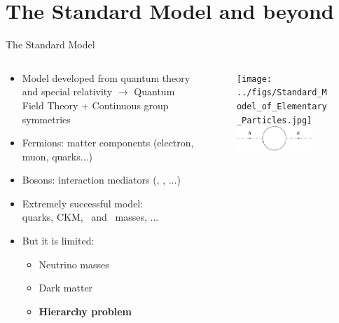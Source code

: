 \section[SM]{The Standard Model and beyond}
\setcounter{tocdepth}{2}

\begin{frame}{The Standard Model}
\vspace{-.2cm}
\begin{columns}

\begin{column}{.50\textwidth}
\begin{block}{}
\begin{itemize}\scriptsize
\item Model developed from quantum theory and special relativity $\to$ Quantum Field Theory + Continuous group symmetries
\item Fermions: matter components (electron, muon, quarks...)
\item Bosons: interaction mediators (\W, \Z, ...)
\item Extremely successful model: \\ quarks, CKM, \W~and \Z~masses, ...
\item But it is limited:
  \begin{itemize}\scriptsize
  \item Neutrino masses
  \item Dark matter
  \item \textbf{Hierarchy problem}
  \end{itemize}
\end{itemize}
\end{block}
\end{column}

\begin{column}{.50\textwidth}
\begin{figure}[!Hhtbp]
  \begin{center}
    \texttt{[image: ../figs/Standard\_Model\_of\_Elementary\_Particles.jpg]}\\
    \vspace{.6cm}
    \includegraphics[width=0.8\textwidth]{../figs/HierarchyLoop.png}
  \end{center}
\end{figure}
\end{column}
\end{columns}
\end{frame}


